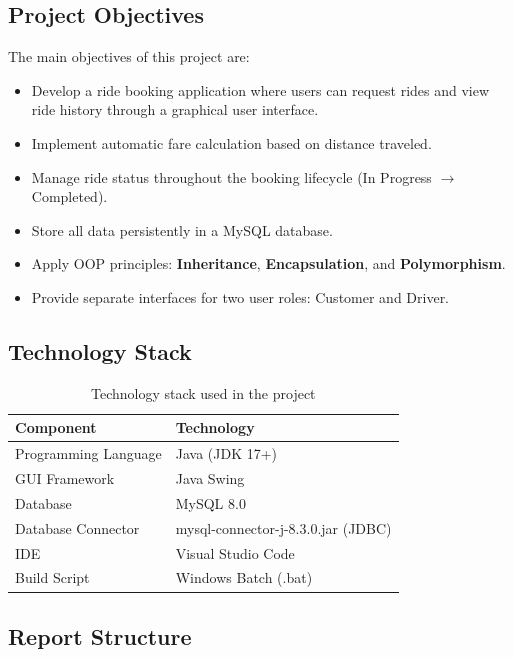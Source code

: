 \documentclass[fonts]{icst}
\begin{document}
\subsection{Project Objectives}

The main objectives of this project are:

\begin{itemize}
    \item Develop a ride booking application where users can request rides and view ride history through a graphical user interface.
    \item Implement automatic fare calculation based on distance traveled.
    \item Manage ride status throughout the booking lifecycle (In Progress $\rightarrow$ Completed).
    \item Store all data persistently in a MySQL database.
    \item Apply OOP principles: \textbf{Inheritance}, \textbf{Encapsulation}, and \textbf{Polymorphism}.
    \item Provide separate interfaces for two user roles: Customer and Driver.
\end{itemize}

\subsection{Technology Stack}

\begin{table}[h!]
\centering
\caption{Technology stack used in the project}
\begin{tabular}{|l|l|}
\hline
\textbf{Component} & \textbf{Technology} \\ \hline
Programming Language & Java (JDK 17+) \\ \hline
GUI Framework & Java Swing \\ \hline
Database & MySQL 8.0 \\ \hline
Database Connector & mysql-connector-j-8.3.0.jar (JDBC) \\ \hline
IDE & Visual Studio Code \\ \hline
Build Script & Windows Batch (.bat) \\ \hline
\end{tabular}
\end{table}

\subsection{Report Structure}
\end{document}
